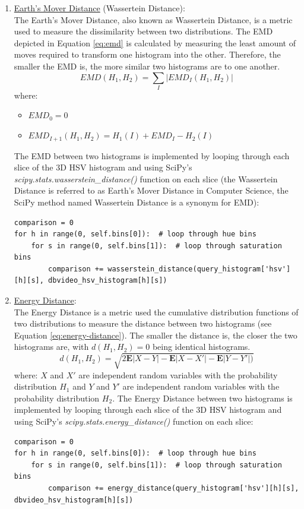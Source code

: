 \begin{enumerate}
    \item \underline{Earth's Mover Distance} (Wassertein Distance):\\
    The Earth's Mover Distance, also known as Wassertein Distance, is a metric used to measure the dissimilarity between two distributions. The EMD depicted in Equation \ref{eq:emd} is calculated by measuring the least amount of moves required to transform one histogram into the other. Therefore, the smaller the EMD is, the more similar two histograms are to one another.
    \begin{equation}
    \label{eq:emd}
        EMD(H_1,H_2)=\sum_I |EMD_I(H_1,H_2)|
    \end{equation}
    where:
        \begin{itemize}
            \item $EMD_0 = 0$
            \item $EMD_{I+1}(H_1,H_2) = H_1(I)+EMD_I-H_2(I)$
        \end{itemize}
    The EMD between two histograms is implemented by looping through each slice of the 3D HSV histogram and using SciPy's \textit{scipy.stats.wasserstein\_distance()} function on each slice (the Wassertein Distance is referred to as Earth's Mover Distance in Computer Science, the SciPy method named Wassertein Distance is a synonym for EMD):
\begin{lstlisting}[caption=Python example]
comparison = 0
for h in range(0, self.bins[0]):  # loop through hue bins
    for s in range(0, self.bins[1]):  # loop through saturation bins
        comparison += wasserstein_distance(query_histogram['hsv'][h][s], dbvideo_hsv_histogram[h][s])
\end{lstlisting}
        
    \item \underline{Energy Distance}:\\
    The Energy Distance is a metric used the cumulative distribution functions of two distributions to measure the distance between two histograms (see Equation \ref{eq:energy-distance}). The smaller the distance is, the closer the two histograms are, with $d(H_1,H_2)=0$ being identical histograms.
    \begin{equation}
    \label{eq:energy-distance}
        d(H_1,H_2) = \sqrt{2\mathbf{E}|X-Y|-\mathbf{E}|X-X'|-\mathbf{E}|Y-Y'|)}
    \end{equation}
    where: $X$ and $X'$ are independent random variables with the probability distribution $H_1$ and $Y$ and $Y'$ are independent random variables with the probability distribution $H_2$.  The Energy Distance between two histograms is implemented by looping through each slice of the 3D HSV histogram and using SciPy's \textit{scipy.stats.energy\_distance()} function on each slice:
\begin{lstlisting}[caption=Python example]
comparison = 0
for h in range(0, self.bins[0]):  # loop through hue bins
    for s in range(0, self.bins[1]):  # loop through saturation bins
        comparison += energy_distance(query_histogram['hsv'][h][s], dbvideo_hsv_histogram[h][s])
\end{lstlisting}
    
\end{enumerate}


